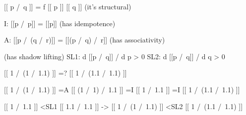 \documentclass[a4paper,UKenglish,cleveref, autoref, thm-restate]{lipics-v2021}
\begin{document}
[[ p /\ q ]] = f [[ p ]]  [[ q ]] (it's structural)

I: [[p /\ p]] = [[p]] (has idempotence)

A: [[p /\ (q /\ r)]] = [[(p /\ q) /\ r]] (has associativity)
 
(has shadow lifting)
SL1: d [[p /\ q]] / d p > 0
SL2: d [[p /\ q]] / d q > 0


[[ 1 /\ (1 /\ 1.1) ]] =? [[ 1 /\ (1.1 /\ 1.1) ]]

[[ 1 /\ (1 /\ 1.1) ]] =A [[ (1 /\ 1) /\ 1.1 ]] =I [[ 1 /\ 1.1 ]] =I [[ 1 /\ (1.1 /\ 1.1) ]]



[[ 1 /\ 1.1 ]] <SL1 [[ 1.1 /\ 1.1 ]]
->
[[ 1 /\ (1 /\ 1.1) ]] <SL2 [[ 1 /\ (1.1 /\ 1.1) ]]






\appendix
\end{document}
